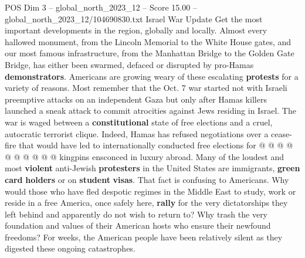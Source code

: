 \begin{textsample}{POS Dim 3 – global\_north\_2023\_12 – Score 15.00 – global\_north\_2023\_12/104690830.txt}
Israel War Update Get the most important developments in the region, globally and locally.
Almost every hallowed monument, from the Lincoln Memorial to the White House gates, and our most famous infrastructure, from the Manhattan Bridge to the Golden Gate Bridge, has either been swarmed, defaced or disrupted by pro-Hamas \textbf{demonstrators}.
Americans are growing weary of these escalating \textbf{protests} for a variety of reasons.
Most remember that the Oct. 7 war started not with Israeli preemptive attacks on an independent Gaza but only after Hamas killers launched a sneak attack to commit atrocities against Jews residing in Israel.
The war is waged between a \textbf{constitutional} state of free elections and a cruel, autocratic terrorist clique.
Indeed, Hamas has refused negotiations over a cease-fire that would have led to internationally conducted free elections for @ @ @ @ @ @ @ @ @ @ kingpins ensconced in luxury abroad.
Many of the loudest and most \textbf{violent} anti-Jewish \textbf{protesters} in the United States are immigrants, \textbf{green} \textbf{card} \textbf{holders} or on \textbf{student} \textbf{visas}.
That fact is confusing to Americans.
Why would those who have fled despotic regimes in the Middle East to study, work or reside in a free America, once safely here, \textbf{rally} for the very dictatorships they left behind and apparently do not wish to return to?
Why trash the very foundation and values of their American hosts who ensure their newfound freedoms?
For weeks, the American people have been relatively silent as they digested these ongoing catastrophes.

\end{textsample}
